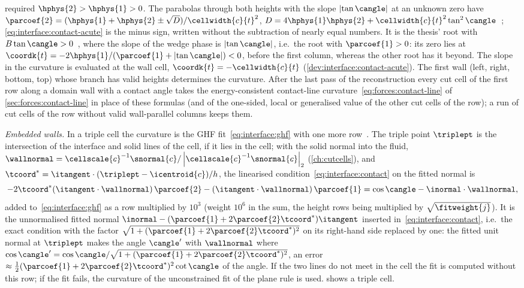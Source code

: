 required $\hphys{2}>\hphys{1}>0$. The parabolas through both heights with the
slope $\abs{\tan\cangle}$ at an unknown zero have
$\parcoef{2}=(\hphys{1}+\hphys{2}\pm\sqrt{D})/\cellwidth{c}{t}^2$,
$D=4\hphys{1}\hphys{2}+\cellwidth{c}{t}^2\tan^2\cangle$~;
\cref{eq:interface:contact-acute} is the minus sign, written without the
subtraction of nearly equal numbers. It is the thesis' root with
$B\tan\cangle>0$~, where the slope of the wedge phase is
$\abs{\tan\cangle}$, i.e.\ the root with $\parcoef{1}>0$: its zero lies at
$\coordk{t}=-2\hphys{1}/(\parcoef{1}+\abs{\tan\cangle})<0$, before the first
column, whereas the other root has it beyond. The slope in the curvature is
evaluated at the wall cell, $\coordk{t}=-\cellwidth{c}{t}$
(\cref{dev:interface:contact-acute}). The first wall (left, right, bottom, top)
whose branch has valid heights determines the curvature. After the last pass
of the reconstruction every cut cell of the first row along a domain wall with
a contact angle takes the energy-consistent contact-line
curvature~\cref{eq:forces:contact-line} of \cref{sec:forces:contact-line} in
place of these formulas (and of the one-sided, local or generalised value of
the other cut cells of the row); a run of cut cells of the row without valid
wall-parallel columns keeps them.

\emph{Embedded walls.} In a triple cell the curvature is the GHF
fit~\cref{eq:interface:ghf} with one more row~. The triple point
$\triplept$ is the intersection of the interface and solid lines of the cell,
if it lies in the cell; with the solid normal into the fluid,
$\wallnormal=\cellscale{c}^{-1}\snormal{c}/\abs{\cellscale{c}^{-1}\snormal{c}}_2$
(\cref{ch:cutcells}), and $\tcoord^*=\itangent\cdot(\triplept-\icentroid{c})/h$,
the linearised condition~\cref{eq:interface:contact} on the fitted normal is
\begin{equation}\label{eq:interface:contact-row}
  -2\tcoord^*(\itangent\cdot\wallnormal)\,\parcoef{2}-(\itangent\cdot\wallnormal)\,\parcoef{1}
    =\cos\cangle-\inormal\cdot\wallnormal,
\end{equation}
added to~\cref{eq:interface:ghf} as a row multiplied by $10^3$ (weight $10^6$ in the
sum, the height rows being multiplied by $\sqrt{\fitweight{j}}$). It is the unnormalised
fitted normal $\inormal-(\parcoef{1}+2\parcoef{2}\tcoord^*)\itangent$ inserted
in~\cref{eq:interface:contact}, i.e.\ the exact condition with the factor
$\sqrt{1+(\parcoef{1}+2\parcoef{2}\tcoord^*)^2}$ on its right-hand side replaced by one:
the fitted unit normal at $\triplept$ makes the angle $\cangle'$ with
$\wallnormal$ where $\cos\cangle'=\cos\cangle/\sqrt{1+(\parcoef{1}+2\parcoef{2}\tcoord^*)^2}$, an error
$\approx\frac12(\parcoef{1}+2\parcoef{2}\tcoord^*)^2\cot\cangle$ of the angle. If the two lines
do not meet in the cell the fit is computed without this row; if the fit fails, the
curvature of the unconstrained fit of the plane rule is used.
 shows a triple cell.

